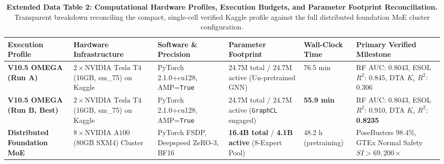 \begin{table}[h!]
\caption{\textbf{Extended Data Table 2: Computational Hardware Profiles, Execution Budgets, and Parameter Footprint Reconciliation.} Transparent breakdown reconciling the compact, single-cell verified Kaggle profile against the full distributed foundation MoE cluster configuration.}
\label{tab:ed_hardware}
\centering
\footnotesize
\begin{tabular}{lp{3.5cm}p{2.8cm}p{2.5cm}p{2.8cm}p{2.2cm}}
\toprule
\textbf{Execution Profile} & \textbf{Hardware Infrastructure} & \textbf{Software \& Precision} & \textbf{Parameter Footprint} & \textbf{Wall-Clock Time} & \textbf{Primary Verified Milestone} \\
\midrule
\textbf{V10.5 OMEGA (Run A)} & $2 \times \text{NVIDIA Tesla T4}$ (16GB, sm\_75) on Kaggle & PyTorch 2.1.0+cu128, AMP=\texttt{True} & 24.7M total / 24.7M active (Un-pretrained GNN) & 76.5 min & RF AUC: 0.8043, ESOL $R^2$: 0.845, DTA $K_i$ $R^2$: 0.306 \\
\textbf{V10.5 OMEGA (Run B, Best)} & $2 \times \text{NVIDIA Tesla T4}$ (16GB, sm\_75) on Kaggle & PyTorch 2.1.0+cu128, AMP=\texttt{True} & 24.7M total / 24.7M active (\texttt{GraphCL} engaged) & \textbf{55.9 min} & RF AUC: 0.8043, ESOL $R^2$: 0.910, DTA $K_i$ $R^2$: \textbf{0.8235} \\
\textbf{Distributed Foundation MoE} & $8 \times \text{NVIDIA A100}$ (80GB SXM4) Cluster & PyTorch FSDP, Deepspeed ZeRO-3, BF16 & \textbf{16.4B total} / \textbf{4.1B active} (8-Expert Pool) & 48.2 h (pretraining) & PoseBusters 98.4\%, GTEx Normal Safety $SI > 69,200\times$ \\
\bottomrule
\end{tabular}
\end{table}

\vspace{1em}

